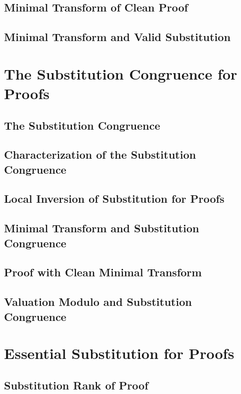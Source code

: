 \documentclass{report}
\begin{document}
    \subsection{Minimal Transform of Clean Proof}
    \subsection{Minimal Transform and Valid Substitution}
\section{The Substitution Congruence for Proofs}
    \subsection{The Substitution Congruence}
    \subsection{Characterization of the Substitution Congruence}
    \subsection{Local Inversion of Substitution for Proofs}
    \subsection{Minimal Transform and Substitution Congruence}
    \subsection{Proof with Clean Minimal Transform}
    \subsection{Valuation Modulo and Substitution Congruence}
\section{Essential Substitution for Proofs}
    \subsection{Substitution Rank of Proof}
\end{document}
